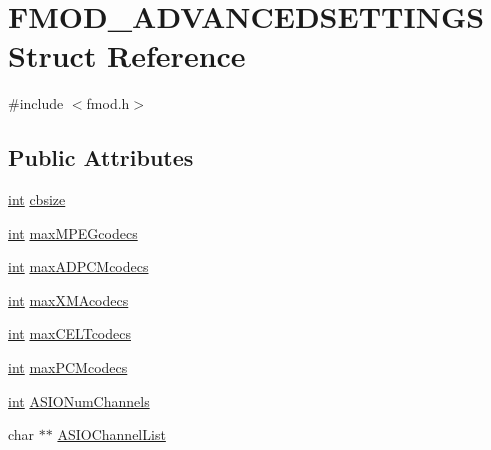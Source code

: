 \hypertarget{struct_f_m_o_d___a_d_v_a_n_c_e_d_s_e_t_t_i_n_g_s}{\section{F\-M\-O\-D\-\_\-\-A\-D\-V\-A\-N\-C\-E\-D\-S\-E\-T\-T\-I\-N\-G\-S Struct Reference}
\label{struct_f_m_o_d___a_d_v_a_n_c_e_d_s_e_t_t_i_n_g_s}
}


{\ttfamily \#include $<$fmod.\-h$>$}

\subsection*{Public Attributes}
\begin{DoxyCompactItemize}
\item 
\hyperlink{wglew_8h_a500a82aecba06f4550f6849b8099ca21}{int} \hyperlink{struct_f_m_o_d___a_d_v_a_n_c_e_d_s_e_t_t_i_n_g_s_a45f37c714e81702c153beaeeaf5789d9}{cbsize}
\item 
\hyperlink{wglew_8h_a500a82aecba06f4550f6849b8099ca21}{int} \hyperlink{struct_f_m_o_d___a_d_v_a_n_c_e_d_s_e_t_t_i_n_g_s_ac38a94fd8d9b1ad4ed77d111cfcafa71}{max\-M\-P\-E\-Gcodecs}
\item 
\hyperlink{wglew_8h_a500a82aecba06f4550f6849b8099ca21}{int} \hyperlink{struct_f_m_o_d___a_d_v_a_n_c_e_d_s_e_t_t_i_n_g_s_afebaec0ba3caa0367c9184416bd74f2a}{max\-A\-D\-P\-C\-Mcodecs}
\item 
\hyperlink{wglew_8h_a500a82aecba06f4550f6849b8099ca21}{int} \hyperlink{struct_f_m_o_d___a_d_v_a_n_c_e_d_s_e_t_t_i_n_g_s_a4c351e7bc430c6c9aa9c87ad5fae8324}{max\-X\-M\-Acodecs}
\item 
\hyperlink{wglew_8h_a500a82aecba06f4550f6849b8099ca21}{int} \hyperlink{struct_f_m_o_d___a_d_v_a_n_c_e_d_s_e_t_t_i_n_g_s_a0f51ebed22a9eda603d37e2f9ccf5376}{max\-C\-E\-L\-Tcodecs}
\item 
\hyperlink{wglew_8h_a500a82aecba06f4550f6849b8099ca21}{int} \hyperlink{struct_f_m_o_d___a_d_v_a_n_c_e_d_s_e_t_t_i_n_g_s_a4fc5ae4871fcfea0c82f818c6f7a9128}{max\-P\-C\-Mcodecs}
\item 
\hyperlink{wglew_8h_a500a82aecba06f4550f6849b8099ca21}{int} \hyperlink{struct_f_m_o_d___a_d_v_a_n_c_e_d_s_e_t_t_i_n_g_s_a90fe2a214a0bdd6569ee48c0b7740cb5}{A\-S\-I\-O\-Num\-Channels}
\item 
char $\ast$$\ast$ \hyperlink{struct_f_m_o_d___a_d_v_a_n_c_e_d_s_e_t_t_i_n_g_s_aebc4867d0c6fb6a95bd67702e6cb5c03}{A\-S\-I\-O\-Channel\-List}
$$
\end{DoxyCompactItemize}
